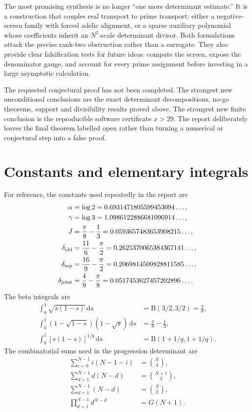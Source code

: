 \documentclass[11pt]{article}
\newcommand{\dd}{\,\mathrm d}
\newcommand{\1}{\mathbf 1}
\theoremstyle{plain}
\theoremstyle{definition}
\theoremstyle{remark}
\begin{document}
The most promising synthesis is no longer ``one more determinant estimate.''
It is a construction that couples real transport to prime transport: either a
negative-screen family with forced adelic alignment, or a sparse auxiliary
polynomial whose coefficients inherit an $N^2$-scale determinant divisor.
Both formulations attack the precise rank-two obstruction rather than a
surrogate.  They also provide clear falsification tests for future ideas:
compute the screen, expose the denominator gauge, and account for every prime
assignment before investing in a large asymptotic calculation.

\begin{outcomebox}
The requested conjectural proof has not been completed.  The strongest new
unconditional conclusions are the exact determinant decompositions,
no-go theorems, support and divisibility results proved above.  The strongest
new finite conclusion is the reproducible software certificate $x>29$.
The report deliberately leaves the final theorem labelled open rather than
turning a numerical or conjectural step into a false proof.
\end{outcomebox}

\appendix

\section{Constants and elementary integrals}
\label{app:constants}

For reference, the constants used repeatedly in the report are
\begin{align*}
 \alpha&=\log2=0.6931471805599453094\ldots,\\
 \gamma&=\log3=1.0986122886681096914\ldots,\\
 J&=\frac\pi8-\frac13=0.0593657483653908215\ldots,\\
 \delta_{\rm old}&=\frac{11}{6}-\frac\pi2
 =0.2625370065384367141\ldots,\\
 \delta_{\rm sep}&=\frac{16}{9}-\frac\pi2
 =0.2069814509828811585\ldots,\\
 \delta_{\rm joint}&=\frac49-\frac\pi8
 =0.0517453627457202896\ldots.
\end{align*}
The beta integrals are
\begin{align*}
 \int_0^1\sqrt{s(1-s)}\dd s
 &=\mathrm B(3/2,3/2)=\frac\pi8,\\
 \int_0^1(1-\sqrt{1-s})(1-\sqrt s)\dd s
 &=\frac\pi8-\frac13,\\
 \int_0^1[s(1-s)]^{1/q}\dd s
 &=\mathrm B(1+1/q,1+1/q).
\end{align*}
The combinatorial sums used in the progression determinant are
\begin{align*}
 \sum_{i=0}^{N-1}i(N-1-i)&=\binom N3,\\
 \sum_{d=1}^{N-1}d(N-d)&=\binom{N+1}{3},\\
 \sum_{d=1}^{N-1}(N-d)&=\binom N2,\\
 \prod_{d=1}^{N-1}d^{N-d}&=G(N+1).
\end{align*}
\end{document}
